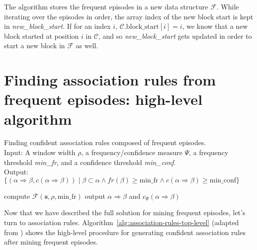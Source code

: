 The algorithm stores the frequent episodes in a new data structure $ \mathcal{F} $. While iterating over the episodes in order, the array index of the new block start is kept in \emph{new\_block\_start}. If for an index $ i $, $ \mathcal{C}. \text{block\_start}[i] = i $, we know that a new block started at position $ i $ in $ \mathcal{C} $, and so \emph{new\_block\_start} gets updated in order to start a new block in $ \mathcal{F} $ as well.



\section{Finding association rules from frequent episodes: high-level algorithm}
\label{sec:association-rules-top-level}

\begin{algorithm}

\caption{Finding confident association rules composed of frequent episodes.\\
Input: A window width $ \rho $, a frequency/confidence measure $ \Psi $, a frequency threshold \emph{min\_fr}, and a confidence threshold \emph{min\_conf}.\\
Output: $ \{ (\alpha \Rightarrow \beta, c(\alpha \Rightarrow \beta)) \mid \beta \subset \alpha \wedge fr(\beta) \geq \text{min\_fr} \wedge c(\alpha \Rightarrow \beta) \geq \text{min\_conf} \} $
}

\begin{algorithmic}[1]

\State compute $ \mathcal{F}(\boldsymbol{s}, \rho, \text{min\_fr}) $
    \ForAll{$ \alpha \subset \beta $}
         \label{alglin:association-rules-top-level:compute-confidence}
            \State output $ \alpha \Rightarrow \beta $ and $ c_\Psi(\alpha \Rightarrow \beta) $
        \EndIf
    \EndFor
\EndFor

\end{algorithmic}

\label{alg:association-rules-top-level}
\end{algorithm}

Now that we have described the full solution for mining frequent episodes, let's turn to association rules. Algorithm~\ref{alg:association-rules-top-level} (adapted from \citep{mannila1997discovery}) shows the high-level procedure for generating confident association rules after mining frequent episodes.

